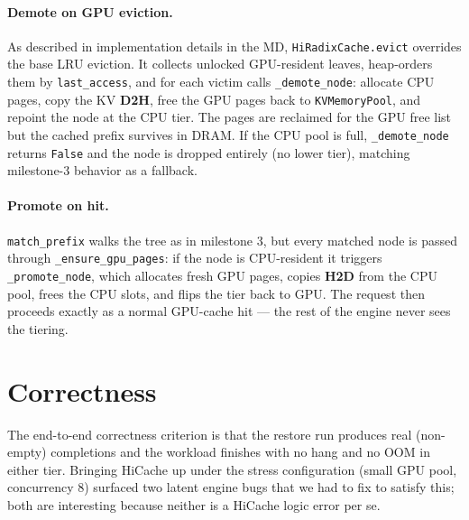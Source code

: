 \documentclass[11pt]{article}
\begin{document}
\paragraph{Demote on GPU eviction.}
As described in implementation details in the MD, \texttt{HiRadixCache.evict} overrides the base LRU eviction. It collects unlocked GPU-resident leaves, heap-orders them by \texttt{last\_access}, and for each victim calls \texttt{\_demote\_node}: allocate CPU pages, copy the KV \textbf{D2H}, free the GPU pages back to \texttt{KVMemoryPool}, and repoint the node at the CPU tier. The pages are reclaimed for the GPU free list but the cached prefix survives in DRAM. If the CPU pool is full, \texttt{\_demote\_node} returns \texttt{False} and the node is dropped entirely (no lower tier), matching milestone-3 behavior as a fallback.

\paragraph{Promote on hit.}
\texttt{match\_prefix} walks the tree as in milestone 3, but every matched node is passed through \texttt{\_ensure\_gpu\_pages}: if the node is CPU-resident it triggers \texttt{\_promote\_node}, which allocates fresh GPU pages, copies \textbf{H2D} from the CPU pool, frees the CPU slots, and flips the tier back to GPU. The request then proceeds exactly as a normal GPU-cache hit --- the rest of the engine never sees the tiering.

\section{Correctness}

The end-to-end correctness criterion is that the restore run produces real (non-empty) completions and the workload finishes with no hang and no OOM in either tier. Bringing HiCache up under the stress configuration (small GPU pool, concurrency 8) surfaced two latent engine bugs that we had to fix to satisfy this; both are interesting because neither is a HiCache logic error per se.
\end{document}
